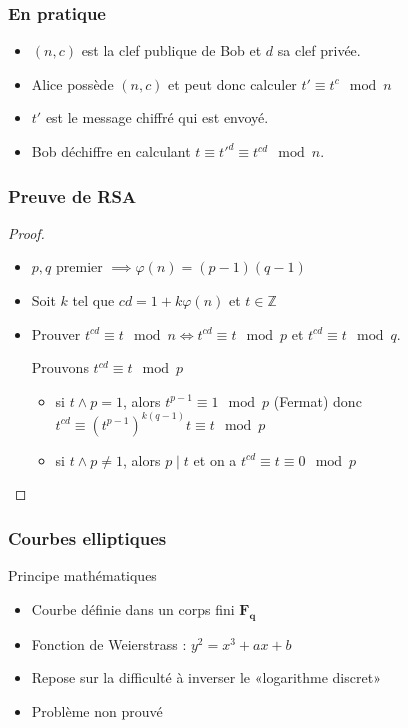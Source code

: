 \documentclass[french]{beamer}
\newcommand{\Z}{\mathbb{Z}}
\begin{document}
\begin{frame}
  \frametitle{En pratique}
  \begin{itemize}
    \item $(n,c)$ est la clef publique de Bob et $d$ sa clef privée.
    \item Alice possède $(n,c)$ et peut donc calculer $t' \equiv t^c
      \mod n$
    \item $t'$ est le message chiffré qui est envoyé.
    \item Bob déchiffre en calculant $t \equiv t'^{d} \equiv t^{cd}
      \mod n$.
  \end{itemize}
\end{frame}

\begin{frame}
  \frametitle{Preuve de RSA}
  \begin{proof}
    \begin{itemize}
      \item $p,q$ premier $\implies \varphi(n) = (p-1)(q-1)$
      \item Soit $k$ tel que $cd = 1 +k\varphi(n)$ et $t\in\Z$
      \item Prouver $t^{cd} \equiv t \mod n \iff t^{cd} \equiv t \mod p$
        et $t^{cd} \equiv t \mod q$.

        Prouvons $t^{cd} \equiv t \mod p$
        \begin{itemize}
          \item si $t\wedge p = 1$, alors $t^{p-1} \equiv 1 \mod p$
            (Fermat) donc $t^{cd} \equiv (t^{p-1})^{k(q-1)}t \equiv t
            \mod p$
          \item si $t\wedge p \neq 1$, alors $p\mid t$ et on a $t^{cd}
            \equiv t \equiv 0 \mod p$
        \end{itemize}
    \end{itemize}
  \end{proof}
\end{frame}

\begin{frame}
  \frametitle{Courbes elliptiques}
  \begin{block}{Principe mathématiques}
    \begin{itemize}
      \item Courbe définie dans un corps fini $\mathbf{F_q}$
      \item Fonction de Weierstrass : $y^2 = x^3 + ax + b$
      \item Repose sur la difficulté à inverser le «logarithme discret»
      \item Problème non prouvé
    \end{itemize}
  \end{block}
\end{frame}
\end{document}
